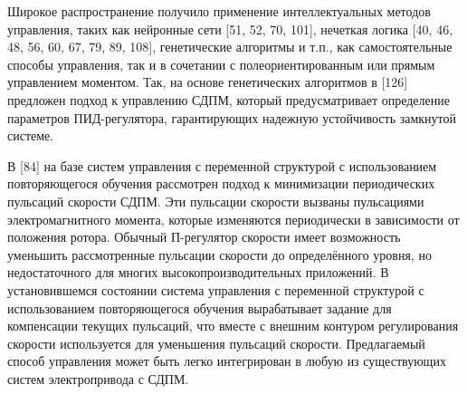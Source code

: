 Широкое распространение получило применение интеллектуальных методов управления, таких как нейронные сети [51, 52, 70, 101], нечеткая логика [40, 46, 48, 56, 60, 67, 79, 89, 108], генетические алгоритмы и т.п., как самостоятельные способы управления, так и в сочетании с полеориентированным или прямым управлением моментом.
Так, на основе генетических алгоритмов в [126] предложен подход к управлению СДПМ, который предусматривает определение параметров ПИД-регулятора, гарантирующих надежную устойчивость замкнутой системе. 

В [84] на базе систем управления с переменной структурой с использованием повторяющегося обучения рассмотрен подход к минимизации периодических пульсаций скорости СДПМ. Эти пульсации скорости вызваны пульсациями электромагнитного момента, которые изменяются периодически в зависимости от положения ротора. Обычный П-регулятор скорости имеет возможность уменьшить рассмотренные пульсации скорости до определённого уровня, но недостаточного для многих высокопроизводительных приложений. В установившемся состоянии система управления с переменной структурой с использованием повторяющегося обучения вырабатывает задание для компенсации текущих пульсаций, что вместе с внешним контуром регулирования скорости используется для уменьшения пульсаций скорости. Предлагаемый способ управления может быть легко интегрирован в любую из существующих систем электропривода с СДПМ. 


